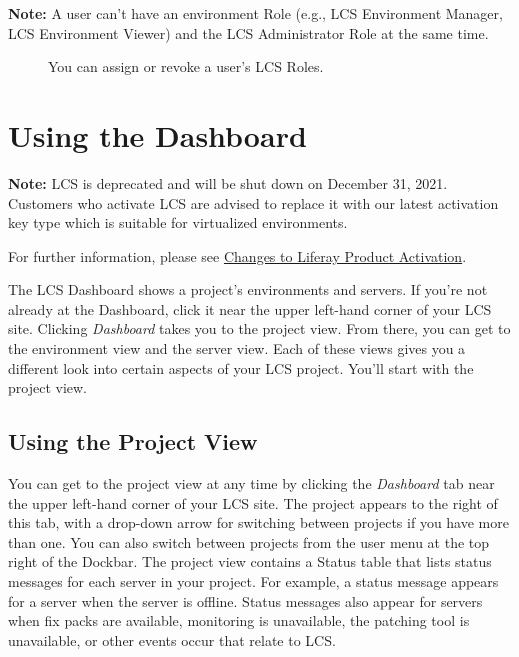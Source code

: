\noindent\hrulefill

\textbf{Note:} A user can't have an environment Role (e.g., LCS
Environment Manager, LCS Environment Viewer) and the LCS Administrator
Role at the same time.

\noindent\hrulefill

\begin{figure}
\centering
{}
\caption{You can assign or revoke a user's LCS Roles.}
\end{figure}

\chapter{Using the Dashboard}\label{using-the-dashboard}

\noindent\hrulefill

\textbf{Note:} LCS is deprecated and will be shut down on December 31,
2021. Customers who activate LCS are advised to replace it with our
latest activation key type which is suitable for virtualized
environments.

For further information, please see
\href{https://help.liferay.com/hc/en-us/articles/4402347960845-Changes-to-Liferay-Product-Activation}{Changes
to Liferay Product Activation}.

\noindent\hrulefill

The LCS Dashboard shows a project's environments and servers. If you're
not already at the Dashboard, click it near the upper left-hand corner
of your LCS site. Clicking \emph{Dashboard} takes you to the project
view. From there, you can get to the environment view and the server
view. Each of these views gives you a different look into certain
aspects of your LCS project. You'll start with the project view.

\section{Using the Project View}\label{using-the-project-view}

You can get to the project view at any time by clicking the
\emph{Dashboard} tab near the upper left-hand corner of your LCS site.
The project appears to the right of this tab, with a drop-down arrow for
switching between projects if you have more than one. You can also
switch between projects from the user menu at the top right of the
Dockbar. The project view contains a Status table that lists status
messages for each server in your project. For example, a status message
appears for a server when the server is offline. Status messages also
appear for servers when fix packs are available, monitoring is
unavailable, the patching tool is unavailable, or other events occur
that relate to LCS.

